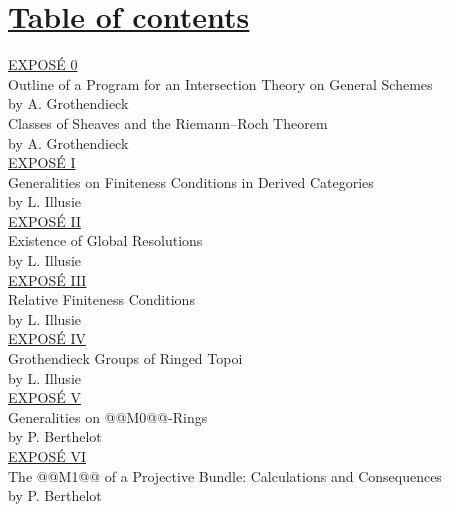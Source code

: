 \section*{\underline{Table of contents}}

\noindent
\underline{EXPOSÉ 0}\\
Outline of a Program for an Intersection Theory on General Schemes\\
by A. Grothendieck \\[8pt]
Classes of Sheaves and the Riemann--Roch Theorem\\
by A. Grothendieck \\[8pt]
\underline{EXPOSÉ I}\\
Generalities on Finiteness Conditions in Derived Categories\\
by L. Illusie \\[8pt]
\underline{EXPOSÉ II}\\
Existence of Global Resolutions\\
by L. Illusie \\[8pt]
\underline{EXPOSÉ III}\\
Relative Finiteness Conditions\\
by L. Illusie \\[8pt]
\underline{EXPOSÉ IV}\\
Grothendieck Groups of Ringed Topoi\\
by L. Illusie \\[8pt]
\underline{EXPOSÉ V}\\
Generalities on @@M0@@-Rings\\
by P. Berthelot \\[8pt]
\underline{EXPOSÉ VI}\\
The @@M1@@ of a Projective Bundle: Calculations and Consequences\\
by P. Berthelot \\[8pt]

